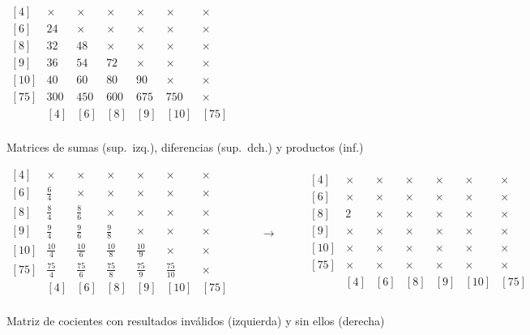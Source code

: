 \begin{center}
$\begin{matrix}
[4]  & \times  & \times  & \times  & \times  & \times  & \times \\
[6]  & 24      & \times  & \times  & \times  & \times  & \times \\
[8]  & 32      & 48      & \times  & \times  & \times  & \times \\
[9]  & 36      & 54      & 72      & \times  & \times  & \times \\
[10] & 40      & 60      & 80      & 90      & \times  & \times \\
[75] & 300     & 450     & 600     & 675     & 750     & \times \\
     &   [4]   &   [6]   &   [8]   &   [9]   &  [10]   &  [75]  \\
\end{matrix}$

Matrices de sumas (sup.\ izq.), diferencias (sup.\ dch.) y productos (inf.)

$\begin{matrix}
[4]  & \times       & \times       & \times       & \times       & \times        & \times \\
[6]  & \frac{6}{4}  & \times       & \times       & \times       & \times        & \times \\
[8]  & \frac{8}{4}  & \frac{8}{6}  & \times       & \times       & \times        & \times \\
[9]  & \frac{9}{4}  & \frac{9}{6}  & \frac{9}{8}  & \times       & \times        & \times \\
[10] & \frac{10}{4} & \frac{10}{6} & \frac{10}{8} & \frac{10}{9} & \times        & \times \\
[75] & \frac{75}{4} & \frac{75}{6} & \frac{75}{8} & \frac{75}{9} & \frac{75}{10} & \times \\
     &      [4]     &      [6]     &      [8]     &      [9]     &      [10]     &  [75]  \\
\end{matrix}
\ \ \ \ \ \ \ \ \ \ \ \rightarrow\ \ \ \ \ \ \ \ \ \ \ \begin{matrix}
[4]  & \times & \times & \times & \times & \times & \times \\
[6]  & \times & \times & \times & \times & \times & \times \\
[8]  & 2      & \times & \times & \times & \times & \times \\
[9]  & \times & \times & \times & \times & \times & \times \\
[10] & \times & \times & \times & \times & \times & \times \\
[75] & \times & \times & \times & \times & \times & \times \\
     &  [4]   &  [6]   &  [8]   &  [9]   &  [10]  &  [75]  \\
\end{matrix}$

Matriz de cocientes con resultados inválidos (izquierda) y sin ellos (derecha)
\end{center}

